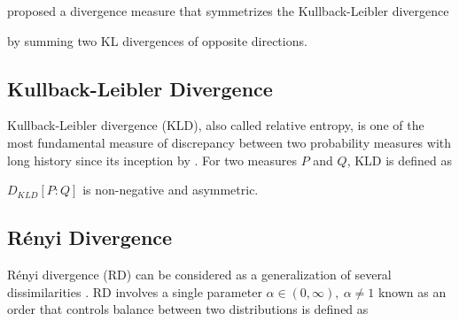 \documentclass[11pt]{article}
\newcommand{\Renyi}{R\'{e}nyi }
\begin{document}
\cite{jeffreys_invariant_1946-1} proposed a divergence measure that symmetrizes the Kullback-Leibler divergence

\begin{center}
\end{center}
by summing two KL divergences of opposite directions.

\subsection{Kullback-Leibler Divergence}\label{diss:KLD}


Kullback-Leibler divergence (KLD), also called relative entropy, is one of the most fundamental measure of discrepancy between two probability measures with long history since its inception by
\cite{kullback_information_1951-1}. For two measures $P$ and $Q$, KLD is defined as


\begin{center}
\end{center}



\begin{Properties}
	\item $D_{KLD}[P:Q]$ is non-negative and asymmetric.
\end{Properties}



\subsection{\Renyi Divergence}\label{diss:RD}

\Renyi divergence (RD) can be considered as a generalization of several dissimilarities \citep{renyi_measures_1961}. RD involves a single parameter $\alpha \in (0,\infty),~\alpha\neq1$ known as an order that controls balance between two distributions is defined as


\begin{center}
\end{center}
\end{document}
